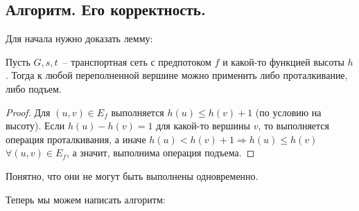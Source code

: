 \subsection{Алгоритм. Его корректность.}
Для начала нужно доказать лемму:
\begin{lemma}\label{someshit8}
	Пусть $G,s,t$~-- транспортная сеть с предпотоком $f$ и какой-то функцией высоты $h$. Тогда к любой переполненной вершине можно применить либо проталкивание, либо подъем.
\end{lemma}
\begin{proof}
	Для $(u,v)\in E_f$ выполняется $h(u)\le h(v)+1$ (по условию на высоту). Если $h(u)-h(v)=1$ для какой-то вершины $v$, то выполняется операция проталкивания, а иначе $h(u)<h(v)+1\Rightarrow h(u)\le h(v)$ $\forall (u,v)\in E_f$, а значит, выполнима операция подъема.
\end{proof}
Понятно, что они не могут быть выполнены одновременно.

Теперь мы можем написать алгоритм:

\begin{algorithm}[H]
	\DontPrintSemicolon
\end{algorithm}


